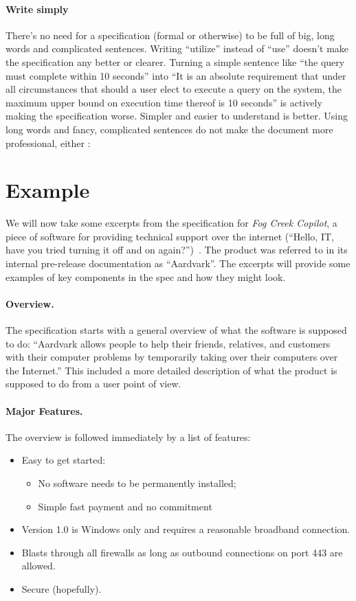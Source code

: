 \paragraph{Write simply} There's no need for a specification (formal or otherwise) to be full of big, long words and complicated sentences. Writing ``utilize'' instead of ``use'' doesn't make the specification any better or clearer. Turning a simple sentence like ``the query must complete within 10 seconds'' into ``It is an absolute requirement that under all circumstances that should a user elect to execute a query on the system, the maximum upper bound on execution time thereof is 10 seconds'' is actively making the specification worse. Simpler and easier to understand is better. Using long words and fancy, complicated sentences do not make the document more professional, either \cite{spolsky:fs4}:


\section*{Example}
We will now take some excerpts from the specification for \textit{Fog Creek Copilot}, a piece of software for providing technical support over the internet (``Hello, IT, have you tried turning it off and on again?'')~\cite{copilotspec}. The product was referred to in its internal pre-release documentation as ``Aardvark''. The excerpts will provide some examples of key components in the spec and how they might look. 


\paragraph{Overview.} The specification starts with a general overview of what the software is supposed to do: ``Aardvark allows people to help their friends, relatives, and customers with their computer problems by temporarily taking over their computers over the Internet.'' This included a more detailed description of what the product is supposed to do from a user point of view.

\paragraph{Major Features.} The overview is followed immediately by a list of features:
\begin{itemize}
	\item Easy to get started: \begin{itemize} \item No software needs to be permanently installed; \item Simple fast payment and no commitment \end{itemize}
	\item Version 1.0 is Windows only and requires a reasonable broadband connection.
	\item Blasts through all firewalls as long as outbound connections on port 443 are allowed.
	\item Secure (hopefully).
\end{itemize}

